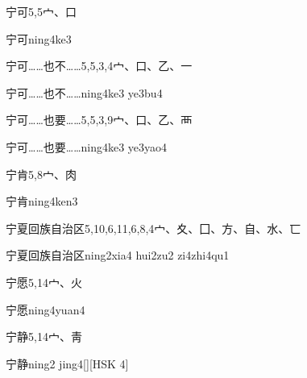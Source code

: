 \begin{Entry}{宁可}{5,5}{⼧、⼝}
  \begin{Phonetics}{宁可}{ning4ke3}
  \end{Phonetics}
\end{Entry}

\begin{Entry}{宁可……也不……}{5,5,3,4}{⼧、⼝、⼄、⼀}
  \begin{Phonetics}{宁可……也不……}{ning4ke3 ye3bu4}
  \end{Phonetics}
\end{Entry}

\begin{Entry}{宁可……也要……}{5,5,3,9}{⼧、⼝、⼄、⾑}
  \begin{Phonetics}{宁可……也要……}{ning4ke3 ye3yao4}
  \end{Phonetics}
\end{Entry}

\begin{Entry}{宁肯}{5,8}{⼧、⾁}
  \begin{Phonetics}{宁肯}{ning4ken3}
  \end{Phonetics}
\end{Entry}

\begin{Entry}{宁夏回族自治区}{5,10,6,11,6,8,4}{⼧、⼢、⼞、⽅、⾃、⽔、⼖}
  \begin{Phonetics}{宁夏回族自治区}{ning2xia4 hui2zu2 zi4zhi4qu1}
  \end{Phonetics}
\end{Entry}

\begin{Entry}{宁愿}{5,14}{⼧、⽕}
  \begin{Phonetics}{宁愿}{ning4yuan4}
  \end{Phonetics}
\end{Entry}

\begin{Entry}{宁静}{5,14}{⼧、⾭}
  \begin{Phonetics}{宁静}{ning2 jing4}[][HSK 4]
  \end{Phonetics}
\end{Entry}

